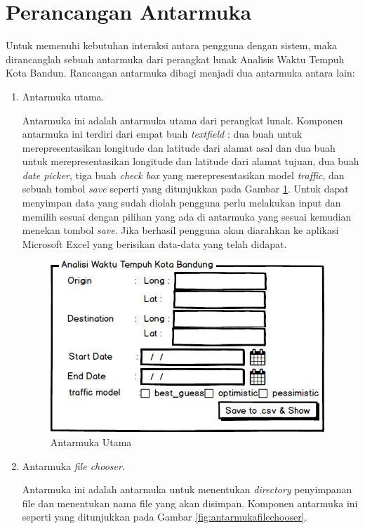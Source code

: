 \section{Perancangan Antarmuka}
\label{sec:perancanganantarmuka}

Untuk memenuhi kebutuhan interaksi antara pengguna dengan sistem, maka dirancanglah sebuah antarmuka dari perangkat lunak Analisis Waktu Tempuh Kota Bandun. Rancangan antarmuka dibagi menjadi dua antarmuka antara lain:
\begin{enumerate}
	\item Antarmuka utama.
	
	Antarmuka ini adalah antarmuka utama dari perangkat lunak. Komponen antarmuka ini terdiri dari empat buah \textit{textfield} : dua buah untuk merepresentasikan longitude dan latitude dari alamat asal dan dua buah untuk merepresentasikan longitude dan latitude dari alamat tujuan, dua buah  \textit{date picker}, tiga buah \textit{check box} yang merepresentasikan model \textit{traffic}, dan sebuah tombol \textit{save} seperti yang ditunjukkan pada Gambar \ref{fig:antarmukautama}. Untuk dapat menyimpan data yang sudah diolah pengguna perlu melakukan input dan memilih sesuai dengan pilihan yang ada di antarmuka yang sesuai kemudian menekan tombol \textit{save}. Jika berhasil pengguna akan diarahkan ke aplikasi Microsoft Excel yang berisikan data-data yang telah didapat.
	
	\begin{figure}[H]
				\centering		
				\includegraphics[scale=0.7]{Gambar/Antarmukautama.png}
				\caption[Antarmuka Utama]{Antarmuka Utama}
				\label{fig:antarmukautama}	
			\end{figure}
	
	\item Antarmuka \textit{file chooser}.
	
	Antarmuka ini adalah antarmuka untuk menentukan \textit{directory} penyimpanan file dan menentukan nama file yang akan disimpan. Komponen antarmuka ini seperti yang ditunjukkan pada Gambar \ref{fig:antarmukafilechooser}.
	

\end{enumerate}
